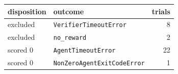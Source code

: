 \begin{tabular}{llr}
\toprule
disposition & outcome & trials \\
\midrule
excluded & \texttt{VerifierTimeoutError} & 8 \\
excluded & \texttt{no\_reward} & 2 \\
scored 0 & \texttt{AgentTimeoutError} & 22 \\
scored 0 & \texttt{NonZeroAgentExitCodeError} & 1 \\
\bottomrule
\end{tabular}
